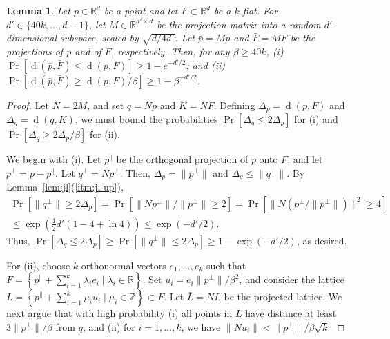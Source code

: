 \documentclass[a4paper,11pt]{paper}
\newcommand{\mathset}[1]{\ensuremath {\mathbb {#1}}}
\newcommand{\R}{\mathset{R}}
\newcommand{\Z}{\mathset{Z}}
\DeclareMathOperator{\dist}{d}
\newtheorem{lemma}[theorem]{Lemma}
\begin{document}
\begin{lemma}\label{lem:jl-kflat}
  Let $p \in \R^d$ be a point and let $F \subset \R^d$ be a $k$-flat.
  For $d' \in \{40k, \dots, d-1\}$, let $M \in \R^{d' \times d}$ be
  the projection matrix into a random $d'$-dimensional
  subspace, scaled by $\sqrt{d/4d'}$. Let $\bar{p} = Mp$ and
  $\bar{F} = MF$
  be the projections of $p$ and of $F$, respectively.
  Then, for any $\beta \geq 40k$,
     (i)
         $\Pr[\dist(\bar{p}, \bar{F}) \leq \dist(p, F)] \geq 1 - e^{-d'/2}$; and (ii)
         $\Pr[\dist(\bar{p}, \bar{F}) \geq \dist(p, F) /\beta] \geq 1 - \beta^{-d'/2}$.
\end{lemma}
\begin{proof}
  Let $N = 2M$, and set $q = Np$ and $K = NF$.
  Defining $\Delta_p = \dist(p, F)$ and $\Delta_{q} = \dist(q, K)$,
  we must bound the probabilities
  $\Pr[\Delta_{q} \leq 2\Delta_p]$ for (i) and
  $\Pr[\Delta_{q} \geq 2\Delta_p/\beta]$ for (ii).

  We begin with (i).  Let $p^\parallel$
  be the orthogonal projection of $p$ onto $F$, and let
  $p^\perp = p - p^\parallel$.
  Let $q^\perp = Np^{\perp}$. Then,
  $\Delta_p = \| p^\perp \|$ and $\Delta_q \leq \|q^\perp\|$.
  By Lemma~\ref{lem:jl}(\ref{itm:jl-up}),
  \begin{multline*}
    \Pr\left[\|q^\perp\| \geq 2 \Delta_p\right]
     = \Pr\left[\|Np^\perp\|/\|p^\perp\| \geq 2\right]
     = \Pr\left[\|N(p^\perp/\|p^\perp\|)\|^2 \geq 4\right]\\
     \leq \exp\left(\tfrac{1}{2}d'(1 - 4 + \ln 4)\right)
     \leq \exp(- d'/2).
  \end{multline*}
  Thus, $\Pr[\Delta_q \leq 2\Delta_p] \geq
  \Pr[\|q^\perp \| \leq 2\Delta_p] \geq 1 - \exp(-d'/2)$, as desired.

  For (ii),  choose $k$ orthonormal vectors
  $e_1, \dots, e_k$ such that
  $F = \left\{p^\parallel + \sum_{i=1}^{k} \lambda_i e_i \mid
  \lambda_i \in \R\right\}$.
  Set $u_i = e_i\|p^\perp\|/\beta^2$, and
  consider the lattice
  $L = \left\{ p^\parallel + \sum_{i=1}^k \mu_i u_i \mid
   \mu_i \in \Z \right\} \subset F$.
  Let $\bar{L} = NL$ be the projected lattice.
  We next argue that with high probability
  (i) all points in $\bar{L}$ have
  distance at least $3\|p^\perp\|/\beta$ from $q$; and (ii)
  for $i = 1, \dots, k$, we have $\|Nu_i\| < \|p^\perp\|/\beta\sqrt{k}$.


\end{proof}
\end{document}
